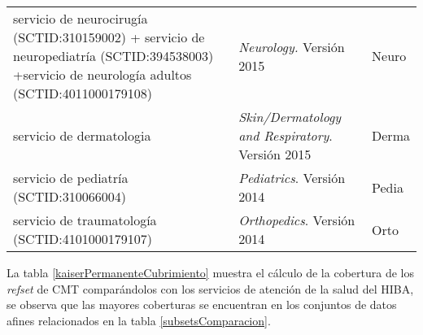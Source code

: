 \begin{table}[htb]
\begin{tabularx}{\textwidth}{@{}XXl@{}}
servicio de neurocirugía \newline (SCTID:310159002)  + \newline servicio de neuropediatría \newline (SCTID:394538003) +\newline  servicio de neurología adultos   \newline (SCTID:4011000179108)                                  & \textit{Neurology.} Versión 2015                & Neuro          \\
servicio de dermatologia                                                                                                   & \textit{Skin/Dermatology and Respiratory}. Versión 2015  &Derma  \\
servicio de pediatría   \newline (SCTID:310066004)                                                                                                        & \textit{Pediatrics}. Versión 2014                     & Pedia    \\
servicio de traumatología  \newline (SCTID:4101000179107)                                                                                                   & \textit{Orthopedics}. Versión 2014                      & Orto  \\ \bottomrule
\end{tabularx}
\end{table}


La tabla \ref{kaiserPermanenteCubrimiento} muestra el cálculo de la cobertura de los \textit{\acrshort{refset}} de \acrshort{CMT} comparándolos con los servicios de atención de la salud del \acrshort{HIBA}, se observa que las mayores coberturas se encuentran en los conjuntos de datos afines relacionados en la tabla \ref{subsetsComparacion}.

